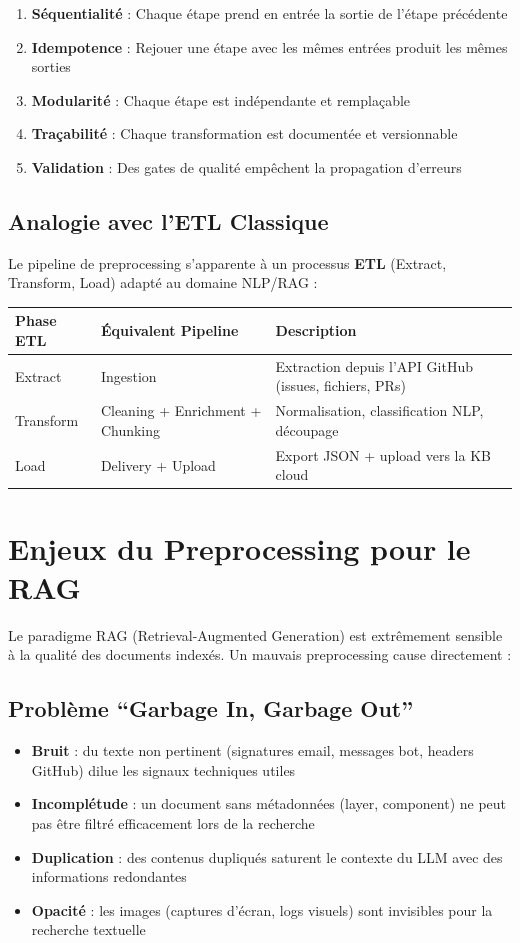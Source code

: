 \documentclass[12pt,a4paper]{report}
\begin{document}
\begin{enumerate}
  \item \textbf{Séquentialité} : Chaque étape prend en entrée la sortie de l'étape précédente
  \item \textbf{Idempotence} : Rejouer une étape avec les mêmes entrées produit les mêmes sorties
  \item \textbf{Modularité} : Chaque étape est indépendante et remplaçable
  \item \textbf{Traçabilité} : Chaque transformation est documentée et versionnable
  \item \textbf{Validation} : Des gates de qualité empêchent la propagation d'erreurs
\end{enumerate}

\subsection{Analogie avec l'ETL Classique}

Le pipeline de preprocessing s'apparente à un processus \textbf{ETL} (Extract, Transform, Load) adapté au domaine NLP/RAG :

\begin{longtable}{p{3cm}p{4cm}p{6cm}}
\toprule
\textbf{Phase ETL} & \textbf{Équivalent Pipeline} & \textbf{Description} \\
\midrule
Extract & Ingestion & Extraction depuis l'API GitHub (issues, fichiers, PRs) \\
Transform & Cleaning + Enrichment + Chunking & Normalisation, classification NLP, découpage \\
Load & Delivery + Upload & Export JSON + upload vers la KB cloud \\
\bottomrule
\end{longtable}

\section{Enjeux du Preprocessing pour le RAG}

Le paradigme RAG (Retrieval-Augmented Generation) est extrêmement sensible à la qualité des documents indexés. Un mauvais preprocessing cause directement :

\subsection{Problème ``Garbage In, Garbage Out''}

\begin{itemize}
  \item \textbf{Bruit} : du texte non pertinent (signatures email, messages bot, headers GitHub) dilue les signaux techniques utiles
  \item \textbf{Incomplétude} : un document sans métadonnées (layer, component) ne peut pas être filtré efficacement lors de la recherche
  \item \textbf{Duplication} : des contenus dupliqués saturent le contexte du LLM avec des informations redondantes
  \item \textbf{Opacité} : les images (captures d'écran, logs visuels) sont invisibles pour la recherche textuelle
\end{itemize}
\end{document}

